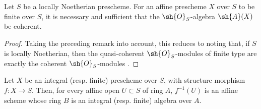 \begin{proposition}[6.1.3]
\label{II.6.1.3}
Let $S$ be a locally Noetherian prescheme.
For an affine prescheme $X$ over $S$ to be finite over $S$, it is necessary and sufficient that the $\sh{O}_S$-algebra $\sh{A}(X)$ be coherent.
\end{proposition}

\begin{proof}
Taking the preceding remark into account, this reduces to noting that, if $S$ is locally Noetherian, then the quasi-coherent $\sh{O}_S$-modules of finite type are exactly the coherent $\sh{O}_S$-modules .
\end{proof}

\begin{proposition}[6.1.4]
\label{II.6.1.4}
Let $X$ be an integral (resp. finite) prescheme over $S$, with structure morphism $f:X\to S$.
Then, for every affine open $U\subset S$ of ring $A$, $f^{-1}(U)$ is an affine scheme whose ring $B$ is an integral (resp. finite) algebra over $A$.
\end{proposition}

